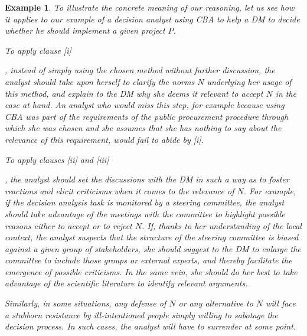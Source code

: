 \documentclass[preprint, french, english, 11pt, authoryear]{elsarticle}%
\newtheorem{example}{Example}
\begin{document}
\begin{example}
To illustrate the concrete meaning of our reasoning, let us see how it applies to our example of a decision analyst using \ac{CBA} to help a \ac{DM} to decide whether he should implement a given project $P$.

\begin{changebar}To apply clause [i]\end{changebar}, instead of simply using the chosen method without further discussion, the analyst should take upon herself to clarify the norms $N$ underlying her usage of this method, and explain to the \ac{DM} why she deems it relevant to accept $N$ in the case at hand.
An analyst who would miss this step, for example because using \ac{CBA} was part of the requirements of the public procurement procedure through which she was chosen and she assumes that she has nothing to say about the relevance of this requirement, would fail to abide by [i].
\begin{changebar}To apply clauses [ii] and [iii]\end{changebar}, the analyst should set the discussions with the \ac{DM} in such a way as to foster reactions and elicit criticisms when it comes to the relevance of $N$.
For example, if the decision analysis task is monitored by a steering committee, the analyst should take advantage of the meetings with the committee to highlight possible reasons either to accept or to reject $N$.
If, thanks to her understanding of the local context, the analyst suspects that the structure of the steering committee is biased against a given group of stakeholders, she should suggest to the \ac{DM} to enlarge the committee to include those groups or external experts, 
and thereby facilitate the emergence of possible criticisms.
In the same vein, she should do her best to take advantage of the scientific literature to identify relevant arguments.  

Similarly, in some situations, any defense of $N$ or any alternative to $N$ will face a stubborn resistance by ill-intentioned people simply willing to sabotage the decision process. In such cases, the analyst will have to surrender at some point.



\end{example}
\end{document}
